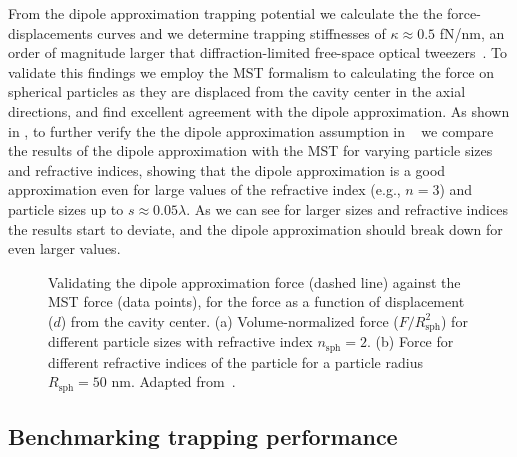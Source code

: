 From the dipole approximation trapping potential we calculate the the force-displacements curves and we determine trapping stiffnesses
of $\kappa \approx 0.5$ fN/nm, an order of magnitude larger that diffraction-limited free-space optical tweezers~\cite{ownpub1}. To validate this findings
we employ the MST formalism to calculating the force on spherical particles as they are displaced from the cavity center in the axial directions, and find excellent
agreement with the dipole approximation. As shown in , to further verify the the dipole approximation assumption in ~\cite{ownpub3} we compare the results of the dipole approximation with the MST
for varying particle sizes and refractive indices, showing that the dipole approximation is a good approximation
even for large values of the refractive index (e.g., $n=3$) and particle sizes up to $s\approx 0.05 \lambda$. As we can see for larger sizes and refractive indices 
the results start to deviate, and the dipole approximation should break down for even larger values.

\begin{figure}[tb]
    \centering
    \caption{Validating the dipole approximation force (dashed line) against the MST force (data points), for the force as a function of displacement ($d$) from the cavity center.
    (a) Volume-normalized force ($F/R^2_\text{sph}$) for different particle sizes with refractive index $n_\text{sph}=2$. (b) Force for different refractive indices of the particle for a particle radius $R_\text{sph}=50$ nm. Adapted from~\cite{ownpub3}.}
    \label{fig:SPIE}
\end{figure}

\subsection*{Benchmarking trapping performance~\cite{ownpub1}}

